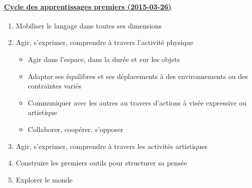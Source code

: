 \documentclass[10pt,french,twocolumn,landscape,a4paper]{article}
\begin{document}
\paragraph{\href{http://www.education.gouv.fr/cid87300/rentree-2015-le-nouveau-programme-de-l-ecole-maternelle.html}{Cycle des apprentissages premiers (2015-03-26)}}
\begin{enumerate}
\item Mobiliser le langage dans toutes ses dimensions
\item Agir, s'exprimer, comprendre à travers l'activité physique
	\begin{itemize}
	\item Agir dans l’espace, dans la durée et sur les objets
	\item Adapter ses équilibres et ses déplacements à des environnements ou des contraintes variés
	\item Communiquer avec les autres au travers d’actions à visée expressive ou artistique
	\item Collaborer, coopérer, s’opposer
	\end{itemize}
\item Agir, s'exprimer, comprendre à travers les activités artistiques
\item Construire les premiers outils pour structurer sa pensée
\item Explorer le monde
\end{enumerate}
\end{document}

